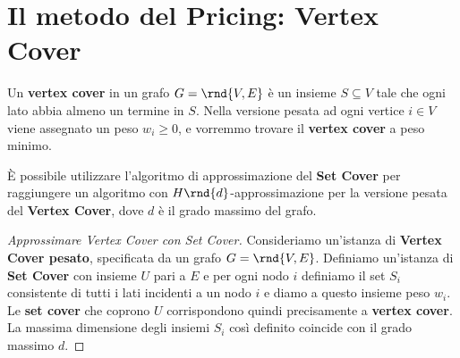 \documentclass[\main/main.tex]{subfiles}
\begin{document}
\section{Il metodo del Pricing: Vertex Cover}
\begin{multicols}{2}
\begin{problem}
    Un \textbf{vertex cover} in un grafo \(G = \rnd{V, E}\) è un insieme \(S \subseteq V\) tale che ogni lato abbia almeno un termine in \(S\). Nella versione pesata ad ogni vertice \(i \in V\) viene assegnato un peso \(w_i \geq 0\), e vorremmo trovare il \textbf{vertex cover} a peso minimo.
\end{problem}
\begin{lemma}
    È possibile utilizzare l'algoritmo di approssimazione del \textbf{Set Cover} per raggiungere un algoritmo con \(H\rnd{d}\)-approssimazione per la versione pesata del \textbf{Vertex Cover}, dove \(d\) è il grado massimo del grafo.
\end{lemma}
\begin{proof}[Approssimare Vertex Cover con Set Cover]
    Consideriamo un'istanza di \textbf{Vertex Cover pesato}, specificata da un grafo \(G = \rnd{V, E}\). Definiamo un'istanza di \textbf{Set Cover} con insieme \(U\) pari a \(E\) e per ogni nodo \(i\) definiamo il set \(S_i\) consistente di tutti i lati incidenti a un nodo \(i\) e diamo a questo insieme peso \(w_i\). Le \textbf{set cover} che coprono \(U\) corrispondono quindi precisamente a \textbf{vertex cover}. La massima dimensione degli insiemi \(S_i\) così definito coincide con il grado massimo \(d\).
    

\end{proof}
\end{multicols}
\end{document}
